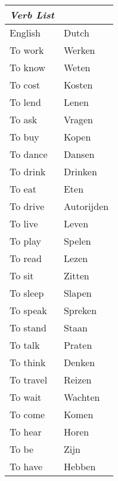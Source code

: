 
\usepackage{color}
\usepackage[margin=1.0in]{geometry}
\usepackage{tabularx}
\usepackage{scrextend}
\usepackage{graphicx}
\usepackage{enumitem}

\topmargin=-1.0in
\setlength{\textheight}{10in}
\newcommand{\sectionhead}[1]{{\large
        {\begin{minipage}[t]{\linewidth}{\textit{\textbf{#1
\vphantom{p\^{e}}}}\end{minipage}}}}}
\topmargin=-1.0in
\setlength{\textheight}{10in}


\begin{tabular}[t]{|l | l|}
    \hline
    \textit{Verb List} &   \\
    \hline
    English   & Dutch      \\
    \hline
    To work   & Werken     \\
    To know   & Weten      \\
    To cost   & Kosten     \\
    To lend   & Lenen      \\
    To ask    & Vragen     \\
    To buy    & Kopen      \\
    To dance  & Dansen     \\
    To drink  & Drinken    \\
    To eat    & Eten       \\
    To drive  & Autorijden \\
    To live   & Leven      \\
    To play   & Spelen     \\
    To read   & Lezen      \\
    To sit    & Zitten     \\
    To sleep  & Slapen     \\
    To speak  & Spreken    \\
    To stand  & Staan      \\
    To talk   & Praten     \\
    To think  & Denken     \\
    To travel & Reizen     \\
    To wait   & Wachten    \\
    To come   & Komen      \\
    To hear   & Horen      \\
    To be     & Zijn       \\
    To have   & Hebben     \\
    \hline
\end{tabular}


